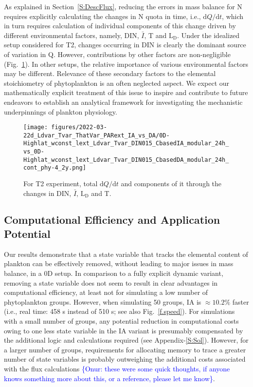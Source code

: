 \documentclass[gmd, manuscript]{copernicus}
\newcommand{\onur}[1]{\textcolor{blue}{\{Onur: #1\}}}
\begin{document}
As explained in Section~\ref{S:DescFlux}, reducing the errors in mass balance for N requires explicitly calculating the changes in N quota in time, i.e., $\textrm{d}Q/\textrm{d}t$, which in turn requires calculation of individual components of this change driven by different environmental factors, namely, DIN, $\bar{I}$, T and $\textrm{L}_{\textrm{D}}$.  Under the idealized setup considered for T2, changes occurring in DIN is clearly the dominant source of variation in Q.  However, contributions by other factors are non-negligible (Fig.~\ref{f.T2dQdt}). In other setups, the relative importance of various environmental factors may be different. Relevance of these secondary factors to the elemental stoichiometry of phytoplankton is an often neglected aspect. We expect our mathematically explicit treatment of this issue to inspire and contribute to future endeavors to establish an analytical framework for investigating the mechanistic underpinnings of plankton physiology.

\begin{figure}[ht!]

\texttt{[image: figures/2022-03-22d\_Ldvar\_Tvar\_ThatVar\_PARext\_IA\_vs\_DA/0D-Highlat\_wconst\_lext\_Ldvar\_Tvar\_DIN015\_CbasedIA\_modular\_24h\_vs\_0D-Highlat\_wconst\_lext\_Ldvar\_Tvar\_DIN015\_CbasedDA\_modular\_24h\_cont\_phy-4\_2y.png]}
\caption{For T2 experiment, total $\textrm{d}Q/\textrm{d}t$ and components of it through the changes in DIN, $\bar{I}$, $\textrm{L}_{\textrm{D}}$ and T.\label{f.T2dQdt}}
\end{figure}

\subsection{Computational Efficiency and Application Potential}
Our results demonstrate that a state variable that tracks the elemental content of plankton can be effectively removed, without leading to major issues in mass balance, in a 0D setup. In comparison to a fully explicit dynamic variant, removing a state variable does not seem to result in clear advantages in computational efficiency, at least not for simulating a low number of phytoplankton groups.  However, when simulating 50 groups, IA is $\approx 10.2 \%$ faster (i.e., real time: 458 s instead of 510 s; see also Fig.~\ref{f.speed}). For simulations with a small number of groups, any potential reduction in computational costs owing to one less state variable in the IA variant is presumably compensated by the additional logic and calculations required (see Appendix-\ref{S:Sol}). However, for a larger number of groups, requirements for allocating memory to trace a greater number of state variables is probably outweighing the additional costs associated with the flux calculations \onur{these were some quick thoughts, if anyone knows something more about this, or a reference, please let me know}.
\end{document}
